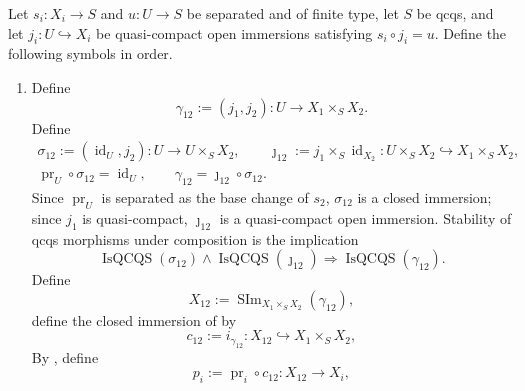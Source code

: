 \begin{definition}
  \label{def:nagata-common-modification}
  \lean{}

  Let $s_i\colon X_i\to S$ and $u\colon U\to S$ be separated and of finite
  type, let $S$ be qcqs, and let
  $j_i\colon U\hookrightarrow X_i$ be quasi-compact open immersions satisfying
  $s_i\circ j_i=u$.  Define the following symbols in order.
  \begin{enumerate}
    \item Define
      \[
        \gamma_{12}:=(j_1,j_2)\colon U\to X_1\times_SX_2.          \tag{CM0}
      \]
      Define
      \[
      \begin{gathered}
        \sigma_{12}:=(\operatorname{id}_U,j_2)
          \colon U\to U\times_SX_2,\qquad
        \jmath_{12}:=j_1\times_S\operatorname{id}_{X_2}
          \colon U\times_SX_2\hookrightarrow X_1\times_SX_2,\\
        \operatorname{pr}_U\circ\sigma_{12}=\operatorname{id}_U,\qquad
        \gamma_{12}=\jmath_{12}\circ\sigma_{12}.
      \end{gathered}                                                \tag{CM0a}
      \]
      Since \(\operatorname{pr}_U\) is separated as the base change of
      \(s_2\), \(\sigma_{12}\) is a closed immersion; since \(j_1\) is
      quasi-compact, \(\jmath_{12}\) is a quasi-compact open immersion.
      Stability of qcqs morphisms under composition is the implication
      \[
        \operatorname{IsQCQS}(\sigma_{12})\wedge
        \operatorname{IsQCQS}(\jmath_{12})
          \Longrightarrow
        \operatorname{IsQCQS}(\gamma_{12}).                       \tag{CM0b}
      \]
      Define
      \[
        X_{12}:=\operatorname{SIm}_{X_1\times_SX_2}(\gamma_{12}),
      \]
      define the closed immersion of
       by
      \[
        c_{12}:=i_{\gamma_{12}}\colon
          X_{12}\hookrightarrow X_1\times_SX_2,
      \]
      By , define
      \[
        p_i:=\operatorname{pr}_i\circ c_{12}\colon X_{12}\to X_i,
\]
\end{enumerate}
\end{definition}
